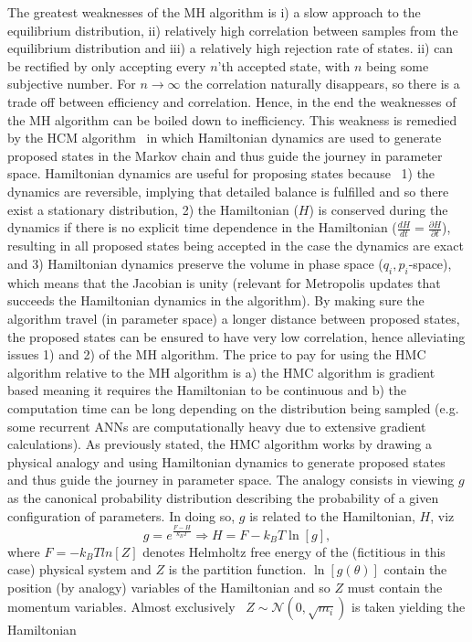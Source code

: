 The greatest weaknesses of the MH algorithm is i) a slow approach to the equilibrium distribution, ii) relatively high correlation between samples from the equilibrium distribution and iii) a relatively high rejection rate of states. ii) can be rectified by only accepting every $n$'th accepted state, with $n$ being some subjective number. For $n\rightarrow \infty$ the correlation naturally disappears, so there is a trade off between efficiency and correlation. Hence, in the end the weaknesses of the MH algorithm can be boiled down to inefficiency. This weakness is remedied by the HCM algorithm~\citep{Duane:1987de} in which Hamiltonian dynamics are used to generate proposed states in the Markov chain and thus guide the journey in parameter space. Hamiltonian dynamics are useful for proposing states because~\citep{Neal2012} 1) the dynamics are reversible, implying that detailed balance is fulfilled and so there exist a stationary distribution, 2) the Hamiltonian ($H$) is conserved during the dynamics if there is no explicit time dependence in the Hamiltonian ($\frac{dH}{dt}=\frac{\partial H}{\partial t}$), resulting in all proposed states being accepted in the case the dynamics are exact and 3) Hamiltonian dynamics preserve the volume in phase space ($q_i,p_i$-space), which means that the Jacobian is unity (relevant for Metropolis updates that succeeds the Hamiltonian dynamics in the algorithm). By making sure the algorithm travel (in parameter space) a longer distance between proposed states, the proposed states can be ensured to have very low correlation, hence alleviating issues 1) and 2) of the MH algorithm. The price to pay for using the HMC algorithm relative to the MH algorithm is a) the HMC algorithm is gradient based meaning it requires the Hamiltonian to be continuous and b) the computation time can be long depending on the distribution being sampled (e.g. some recurrent ANNs are computationally heavy due to extensive gradient calculations).\newline
As previously stated, the HMC algorithm works by drawing a physical analogy and using Hamiltonian dynamics to generate proposed states and thus guide the journey in parameter space. The analogy consists in viewing $g$ as the canonical probability distribution describing the probability of a given configuration of parameters. In doing so, $g$ is related to the Hamiltonian, $H$, viz
\begin{equation}
	g=e^{\frac{F-H}{k_BT}}\Rightarrow H=F-k_BT\ln[g],
\end{equation}
where $F=-k_BTln[Z]$ denotes Helmholtz free energy of the (fictitious in this case) physical system and $Z$ is the partition function. $\ln[g(\theta)]$ contain the position (by analogy) variables of the Hamiltonian and so $Z$ must contain the momentum variables. Almost exclusively~\citep{Betancourt2013} $Z\sim \mathcal{N}(0,\sqrt{m_i})$ is taken yielding the Hamiltonian 
